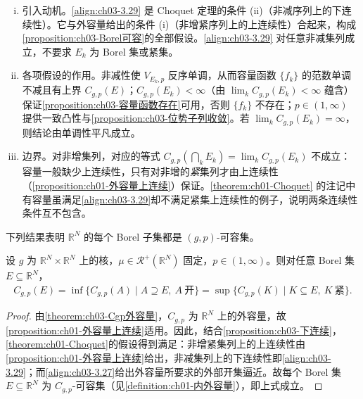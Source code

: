 \documentclass[../../main.tex]{subfiles}%
\begin{document}
\begin{remark}\label{remark:ch03-下连续}
\begin{enumerate}[(i)]
\item 引入动机。\eqref{align:ch03-3.29} 是 Choquet 定理的条件 (ii)（非减序列上的下连续性）。它与外容量给出的条件 (i)（非增紧序列上的上连续性）合起来，构成\cref{proposition:ch03-Borel可容}的全部假设。\eqref{align:ch03-3.29} 对任意非减集列成立，不要求 $E_k$ 为 Borel 集或紧集。

\item 各项假设的作用。非减性使 $V_{E_k,p}$ 反序单调，从而容量函数 $\{f_k\}$ 的范数单调不减且有上界 $C_{g,p}(E)$；$C_{g,p}(E_k)<\infty$（由 $\lim_kC_{g,p}(E_k)<\infty$ 蕴含）保证\cref{proposition:ch03-容量函数存在}可用，否则 $\{f_k\}$ 不存在；$p\in(1,\infty)$ 提供一致凸性与\cref{proposition:ch03-位势子列收敛}。若 $\lim_kC_{g,p}(E_k)=\infty$，则结论由单调性平凡成立。

\item 边界。对非增集列，对应的等式 $C_{g,p}\left(\bigcap_kE_k\right)=\lim_kC_{g,p}(E_k)$ 不成立：容量一般缺少上连续性，只有对非增的\emph{紧}集列才由上连续性（\cref{proposition:ch01-外容量上连续}）保证。\cref{theorem:ch01-Choquet} 的注记中有容量虽满足\eqref{align:ch03-3.29}却不满足紧集上连续性的例子，说明两条连续性条件互不包含。
\end{enumerate}
\end{remark}

下列结果表明 $\mathbb{R}^N$ 的每个 Borel 子集都是 $(g,p)$-可容集。

\begin{proposition}\label{proposition:ch03-Borel可容}
设 $g$ 为 $\mathbb{R}^N\times\mathbb{R}^N$ 上的核，$\mu\in\mathscr{R}^+(\mathbb{R}^N)$ 固定，$p\in(1,\infty)$。则对任意 Borel 集 $E\subseteq\mathbb{R}^N$，
\begin{align*}
C_{g,p}(E)=\inf\{C_{g,p}(A)\mid A\supseteq E,\ A\ \text{开}\}=\sup\{C_{g,p}(K)\mid K\subseteq E,\ K\ \text{紧}\}.
\end{align*}
\end{proposition}

\begin{proof}
由\cref{theorem:ch03-Cgp外容量}，$C_{g,p}$ 为 $\mathbb{R}^N$ 上的外容量，故\cref{proposition:ch01-外容量上连续}适用。因此，结合\cref{proposition:ch03-下连续}，\cref{theorem:ch01-Choquet}的假设得到满足：非增紧集列上的上连续性由\cref{proposition:ch01-外容量上连续}给出，非减集列上的下连续性即\eqref{align:ch03-3.29}；而\eqref{align:ch03-3.27}给出外容量所要求的外部开集逼近。故每个 Borel 集 $E\subseteq\mathbb{R}^N$ 为 $C_{g,p}$-可容集（见\cref{definition:ch01-内外容量}），即上式成立。
\end{proof}
\end{document}
